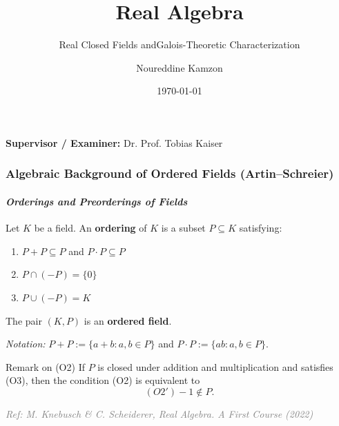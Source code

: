 \documentclass[11pt]{beamer}
\title{Real Algebra}
\subtitle{Real Closed Fields and\newline Galois-Theoretic Characterization}
\author{Noureddine Kamzon}
\institute{University of Passau}
\date{\today}
\begin{document}
\begin{frame}[plain]
  \titlepage
  \vspace{0.4em}
  \begin{center}
    \small
    \textbf{Supervisor / Examiner:} \quad Dr. Prof. Tobias Kaiser
  \end{center}
\end{frame}



\begin{frame}
    \frametitle{Algebraic Background of Ordered Fields (Artin--Schreier)}
    \framesubtitle{\textit{Orderings and Preorderings of Fields}}
    
    \small
    \begin{definition}
        Let $K$ be a field. An \textbf{ordering} of $K$ is a subset $P \subseteq K$ satisfying:
        \begin{enumerate}[(O1)]
            \setlength{\itemsep}{0.15em}
            \item $P + P \subseteq P$ and $P \cdot P \subseteq P$
            \item $P \cap (-P) = \{0\}$
            \item $P \cup (-P) = K$
        \end{enumerate}
        The pair $(K,P)$ is an \textbf{ordered field}.
    \end{definition}

    \vspace{-0.3em}
    {\tiny \textit{Notation:} $P + P := \{a+b : a,b\in P\}$ and $P\cdot P := \{ab : a,b\in P\}$.}
    \vspace{0.25em}

    \begin{block}{\footnotesize Remark on (O2)}
        If $P$ is closed under addition and multiplication and satisfies (O3), then the condition (O2) is equivalent to
        \[
        (O2') -1 \notin P.
        \]
    \end{block}
    
    \vspace{0.2em}
    \begin{flushright}
        \textcolor{gray}{\tiny \textit{Ref: M. Knebusch \& C. Scheiderer, Real Algebra. A First Course (2022)}}
    \end{flushright}
\end{frame}
\end{document}
